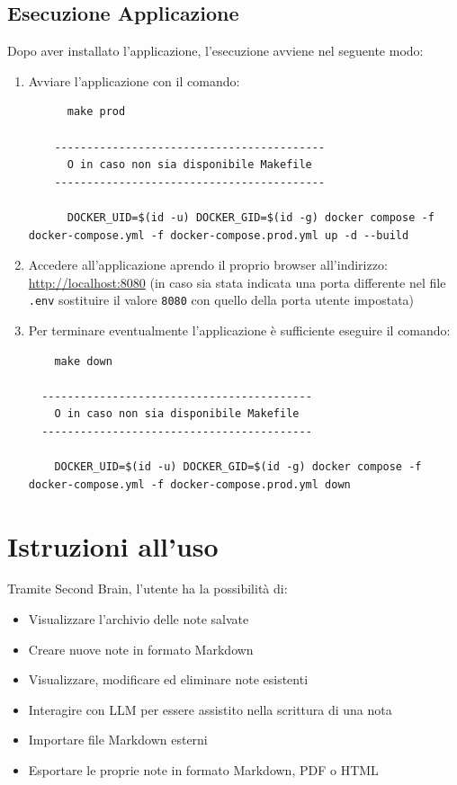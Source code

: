 \documentclass[a4paper,10pt]{article}
\begin{document}
\subsection{Esecuzione Applicazione}
Dopo aver installato l'applicazione, l'esecuzione avviene nel seguente modo:
\begin{enumerate}
  \item Avviare l'applicazione con il comando:

    \begin{lstlisting}
      make prod    

    ------------------------------------------
      O in caso non sia disponibile Makefile
    ------------------------------------------
    
      DOCKER_UID=$(id -u) DOCKER_GID=$(id -g) docker compose -f docker-compose.yml -f docker-compose.prod.yml up -d --build
    \end{lstlisting}    
    
  \item Accedere all'applicazione aprendo il proprio browser all'indirizzo: \href{http://localhost:8080}{http://localhost:8080} (in caso sia stata indicata una porta differente nel file \texttt{.env} sostituire il valore \texttt{8080} con quello della porta utente impostata)

  \item Per terminare eventualmente l'applicazione è sufficiente eseguire il comando:
  
  \begin{lstlisting}
    make down

  ------------------------------------------
    O in caso non sia disponibile Makefile
  ------------------------------------------
    
    DOCKER_UID=$(id -u) DOCKER_GID=$(id -g) docker compose -f docker-compose.yml -f docker-compose.prod.yml down
  \end{lstlisting}

\end{enumerate} 

\newpage

\section{Istruzioni all'uso}
Tramite Second Brain, l'utente ha la possibilità di:
\begin{itemize}
    \item Visualizzare l'archivio delle note salvate
    \item Creare nuove note in formato Markdown
    \item Visualizzare, modificare ed eliminare note esistenti
    \item Interagire con LLM per essere assistito nella scrittura di una nota
    \item Importare file Markdown esterni
    \item Esportare le proprie note in formato Markdown, PDF o HTML
\end{itemize}
\end{document}
